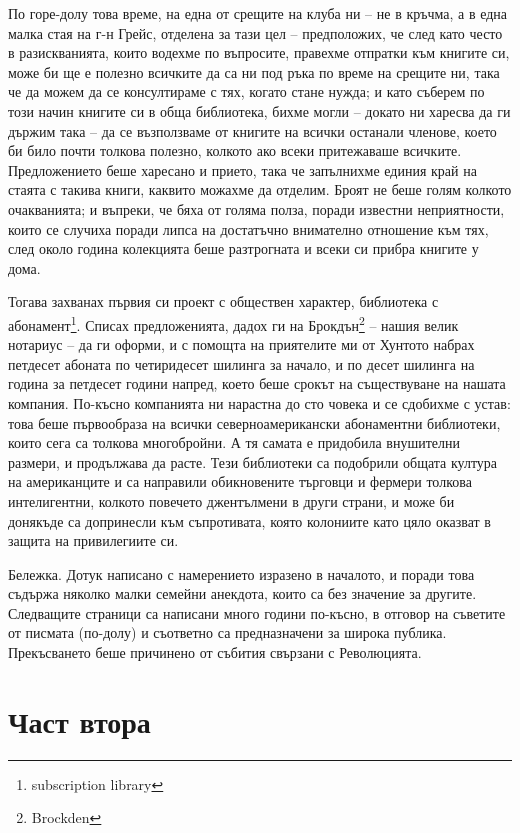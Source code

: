 \documentclass[12pt]{book}
\begin{document}
По горе-долу това време, на една от срещите на клуба ни – не в кръчма, а в една малка стая на г-н Грейс, отделена за тази цел – предположих, че след като често в разискванията, които водехме по въпросите, правехме отпратки към книгите си, може би ще е полезно всичките да са ни под ръка по време на срещите ни, така че да можем да се консултираме с тях, когато стане нужда; и като съберем по този начин книгите си в обща библиотека, бихме могли – докато ни харесва да ги държим така – да се възползваме от книгите на всички останали членове, което би било почти толкова полезно, колкото ако всеки притежаваше всичките. Предложението беше харесано и прието, така че запълнихме единия край на стаята с такива книги, каквито можахме да отделим. Броят не беше голям колкото очакванията; и въпреки, че бяха от голяма полза, поради известни неприятности, които се случиха поради липса на достатъчно внимателно отношение към тях, след около година колекцията беше разтрогната и всеки си прибра книгите у дома. 

Тогава захванах първия си проект с обществен характер, библиотека с абонамент\footnote{subscription library}. Списах предложенията, дадох ги на Брокдън\footnote{Brockden} – нашия  велик нотариус – да ги оформи, и с помощта на приятелите ми от Хунтото набрах петдесет абоната по четиридесет шилинга за начало, и по десет шилинга на година за петдесет години напред, което беше срокът на съществуване на нашата компания. По-късно компанията ни нарастна до сто човека и се сдобихме с устав: това беше първообраза на всички северноамерикански абонаментни библиотеки, които сега са толкова многобройни. А тя самата е придобила внушителни размери, и продължава да расте. Тези библиотеки са подобрили общата култура на американците и са направили обикновените търговци и фермери толкова интелигентни, колкото повечето джентълмени в други страни, и може би донякъде са допринесли към съпротивата, която колониите като цяло оказват в защита на привилегиите си.

Бележка. Дотук написано с намерението изразено в началото, и поради това съдържа няколко малки семейни анекдота, които са без значение за другите. Следващите страници са написани много години по-късно, в отговор на съветите от писмата (по-долу) и съответно са предназначени за широка публика. Прекъсването беше причинено от събития свързани с Революцията.

\chapter{Част втора}
\end{document}
